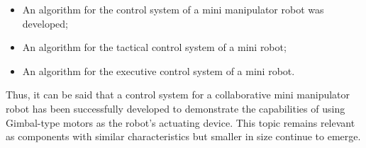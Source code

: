 \begin{itemize}
	\item An algorithm for the control system of a mini manipulator robot was developed;
	\item An algorithm for the tactical control system of a mini robot;
	\item An algorithm for the executive control system of a mini robot.
\end{itemize}
Thus, it can be said that a control system for a collaborative mini manipulator robot has been successfully developed to demonstrate the capabilities of using Gimbal-type motors as the robot's actuating device. This topic remains relevant as components with similar characteristics but smaller in size continue to emerge.